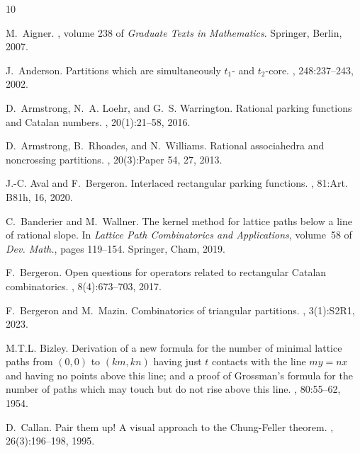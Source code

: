 \documentclass[11pt]{article}
\theoremstyle{definition} %
\numberwithin{equation}{section}
\begin{document}
%
%

\begin{thebibliography}{10}

M.~Aigner.
, volume 238 of {\em Graduate Texts
  in Mathematics}.
\newblock Springer, Berlin, 2007.

J.~Anderson.
\newblock Partitions which are simultaneously $t_1$- and $t_2$-core.
, 248:237--243, 2002.

D.~Armstrong, N.~A. Loehr, and G.~S. Warrington.
\newblock Rational parking functions and {C}atalan numbers.
, 20(1):21–58, 2016.

D.~Armstrong, B.~Rhoades, and N.~Williams.
\newblock Rational associahedra and noncrossing partitions.
, 20(3):Paper 54, 27, 2013.

J.-C. Aval and F.~Bergeron.
\newblock Interlaced rectangular parking functions.
, 81:Art. B81h, 16, 2020.

C.~Banderier and M.~Wallner.
\newblock The kernel method for lattice paths below a line of rational slope.
\newblock In {\em Lattice Path Combinatorics and Applications}, volume~58 of
  {\em Dev. Math.}, pages 119--154. Springer, Cham, 2019.

F.~Bergeron.
\newblock Open questions for operators related to rectangular {C}atalan
  combinatorics.
, 8(4):673--703, 2017.

F.~Bergeron and M.~Mazin.
\newblock Combinatorics of triangular partitions.
, 3(1):S2R1, 2023.

M.T.L. Bizley.
\newblock Derivation of a new formula for the number of minimal lattice paths
  from {$(0,0)$} to {$(km,kn)$} having just {$t$} contacts with the line
  {$my=nx$} and having no points above this line; and a proof of {G}rossman's
  formula for the number of paths which may touch but do not rise above this
  line.
, 80:55--62, 1954.

D.~Callan.
\newblock Pair them up! {A} visual approach to the {C}hung-{F}eller theorem.
, 26(3):196--198, 1995.


\end{thebibliography}
\end{document}
